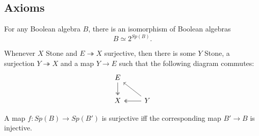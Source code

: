 \subsection{Axioms}
\begin{axiom}
  For any Boolean algebra $B$, there
  is an isomorphism of Boolean algebras
  $$B\simeq  2^{Sp(B)}.$$ 
\end{axiom} 
\begin{axiom}
  Whenever $X$ Stone and $E\twoheadrightarrow X$ surjective, then there is some $Y$ Stone,
    a surjection $Y \twoheadrightarrow X$ and a map $Y\to E$ such that the following diagram commutes:
    \begin{equation}\begin{tikzcd}
      E \arrow[d,""',two heads]\\
      X & \arrow[l, "", two heads] Y\arrow[lu, ""']
    \end{tikzcd}\end{equation}  
\end{axiom} 

\begin{axiom}
  A map $f:Sp(B)\to Sp(B')$ is surjective iff the corresponding map $B' \to B$ is injective.
\end{axiom} 

